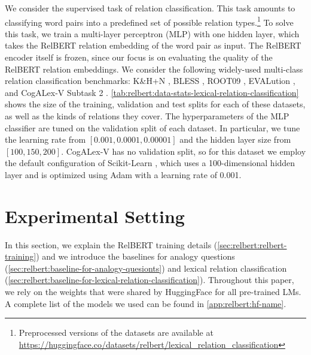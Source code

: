 \documentclass[3p]{elsarticle}
\begin{document}
{We consider the supervised task of relation classification. This task amounts to classifying word pairs into a predefined set of possible relation types.\footnote{Preprocessed versions of the datasets are available at \url{https://huggingface.co/datasets/relbert/lexical_relation_classification}} To solve this task, we train a multi-layer perceptron (MLP) with one hidden layer, which takes the RelBERT relation embedding of the word pair as input. The RelBERT encoder itself is frozen, since our focus is on evaluating the quality of the RelBERT relation embeddings. We consider the following widely-used multi-class relation classification benchmarks: K\&H+N \cite{necsulescu-etal-2015-reading}, BLESS \cite{baroni-lenci-2011-blessed}, ROOT09 \cite{santus-etal-2016-nine}, EVALution \cite{santus-etal-2015-evalution}, and CogALex-V Subtask 2 \cite{santus-etal-2016-cogalex}. \autoref{tab:relbert:data-stats-lexical-relation-classification} shows the size of the training, validation and test splits for each of these datasets, as well as the kinds of relations they cover. The hyperparameters of the MLP classifier are tuned on the validation split of each dataset. In particular, we tune the learning rate from $[0.001, 0.0001, 0.00001]$ and the hidden layer size from $[100, 150, 200]$. CogALex-V has no validation split, so for this dataset we employ the default configuration of Scikit-Learn \cite{JMLR:v12:pedregosa11a}, which uses a 100-dimensional hidden layer and is optimized using Adam with a learning rate of 0.001. 



\section{Experimental Setting}\label{experimental-setting}
In this section, we explain the RelBERT training details (\autoref{sec:relbert:relbert-training}) and we introduce the baselines for analogy questions (\autoref{sec:relbert:baseline-for-analogy-quesionts}) and lexical relation classification (\autoref{sec:relbert:baseline-for-lexical-relation-classification}). Throughout this paper, we rely on the weights that were shared by HuggingFace \cite{wolf-etal-2020-transformers} for all pre-trained LMs. A complete list of the models we used can be found in \ref{app:relbert:hf-name}.

}
\end{document}
